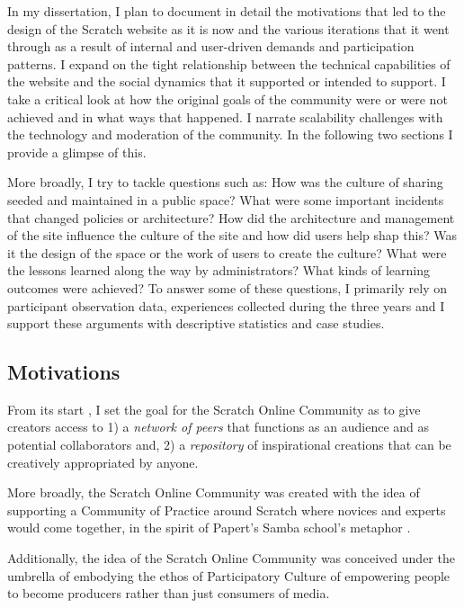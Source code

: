 In my dissertation, I plan to document in detail the motivations that led to the design of the Scratch website as it is now and the various iterations that it went through as a result of internal and user-driven demands and participation patterns.
I expand on the tight relationship between the technical capabilities of the website and the social dynamics that it supported or intended to support.
I take a critical look at how the original goals of the community were or were not achieved and in what ways that happened. 
I narrate scalability challenges with the technology and moderation of the community.
In the following two sections I provide a glimpse of this.

More broadly, I try to tackle questions such as: How was the culture of sharing seeded and maintained in a public space? What were some important incidents that changed policies or architecture? How did the architecture and management of the site influence the culture of the site and how did users help shap this? 
Was it the design of the space or the work of users to create the culture?
 What were the lessons learned along the way by administrators? What kinds of learning outcomes were achieved?
To answer some of these questions, I primarily rely on participant observation data, experiences collected during the three years and I support these arguments with descriptive statistics and case studies.


\subsection{Motivations}

From its start \citep{monroy-hernandez_scratchr:_2007,monroy-hernandez_empowering_2008}, I set the goal for the Scratch Online Community as to give creators access to 
1) a \emph{network of peers} that functions as an audience and as potential collaborators and,
2) a \emph{repository} of inspirational creations that can be creatively appropriated by anyone.

More broadly, the Scratch Online Community was created with the idea of supporting a Community of Practice around Scratch where novices and experts would come together,  in the spirit of Papert's Samba school's metaphor \citep{papert_mindstorms_1980}.

Additionally, the idea of the Scratch Online Community was conceived under the umbrella of embodying the ethos of Participatory Culture of empowering people to become producers rather than just consumers of media.

